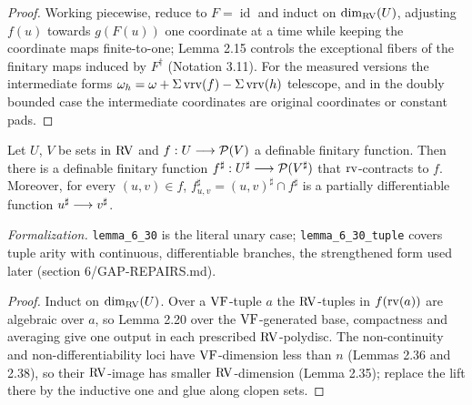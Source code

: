 \begin{proof}
\leanok
Working piecewise, reduce to $F=\operatorname{id}$ and induct on $\dim_{\mathrm{RV}}(U)$, adjusting $f(u)$ towards $g(F(u))$ one coordinate at a time while keeping the coordinate maps finite-to-one; Lemma 2.15 controls the exceptional fibers of the finitary maps induced by $F^{\dagger}$ (Notation 3.11). For the measured versions the intermediate forms $\omega_h=\omega+\Sigma\operatorname{vrv}(f)-\Sigma\operatorname{vrv}(h)$ telescope, and in the doubly bounded case the intermediate coordinates are original coordinates or constant pads.
\end{proof}

\setcounter{theorem}{29}
\begin{lemma}
\label{RVlift}
\leanok
{}
Let $U$, $V$ be sets in $\mathrm{RV}$ and $f:U\longrightarrow\mathcal{P}(V)$ a definable finitary function. Then there is a definable finitary function $f^\sharp:U^\sharp\longrightarrow\mathcal{P}(V^\sharp)$ that $\operatorname{rv}$-contracts to $f$. Moreover, for every $(u,v)\in f$, $f^\sharp_{u,v}=(u,v)^\sharp\cap f^\sharp$ is a partially differentiable function $u^\sharp\longrightarrow v^\sharp$.

\emph{Formalization.} \texttt{lemma\_6\_30} is the literal unary case; \texttt{lemma\_6\_30\_tuple} covers tuple arity with continuous, differentiable branches, the strengthened form used later (section 6/GAP-REPAIRS.md).
\end{lemma}

\begin{proof}
\leanok
Induct on $\dim_{\mathrm{RV}}(U)$. Over a $\mathrm{VF}$-tuple $a$ the $\mathrm{RV}$-tuples in $f(\operatorname{rv}(a))$ are algebraic over $a$, so Lemma 2.20 over the $\mathrm{VF}$-generated base, compactness and averaging give one output in each prescribed $\mathrm{RV}$-polydisc. The non-continuity and non-differentiability loci have $\mathrm{VF}$-dimension less than $n$ (Lemmas 2.36 and 2.38), so their $\mathrm{RV}$-image has smaller $\mathrm{RV}$-dimension (Lemma 2.35); replace the lift there by the inductive one and glue along clopen sets.
\end{proof}

